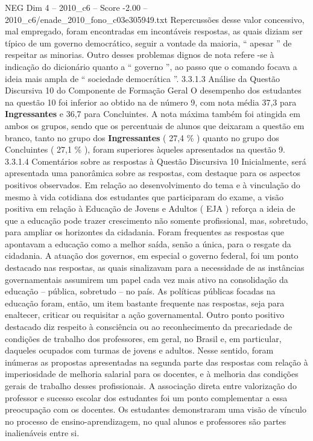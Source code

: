 \begin{textsample}{NEG Dim 4 – 2010\_c6 – Score -2.00 – 2010\_c6/enade\_2010\_fono\_c03e305949.txt}
Repercussões desse valor concessivo, mal empregado, foram encontradas em incontáveis respostas, as quais diziam ser típico de um governo democrático, seguir a vontade da maioria, “ apesar ” de respeitar as minorias.
Outro desses problemas dignos de nota refere -se à indicação do dicionário quanto a “ governo ”, ao passo que o comando focava a ideia mais ampla de “ sociedade democrática ”. 3.3.1.3 Análise da Questão Discursiva 10 do Componente de Formação Geral O desempenho dos estudantes na questão 10 foi inferior ao obtido na de número 9, com nota média 37,3 para \textbf{Ingressantes} e 36,7 para Concluintes.
A nota máxima também foi atingida em ambos os grupos, sendo que os percentuais de alunos que deixaram a questão em branco, tanto no grupo dos \textbf{Ingressantes} ( 27,4 \% ) quanto no grupo dos Concluintes ( 27,1 \% ), foram superiores àqueles apresentados na questão 9. 3.3.1.4 Comentários sobre as respostas à Questão Discursiva 10 Inicialmente, será apresentada uma panorâmica sobre as respostas, com destaque para os aspectos positivos observados.
Em relação ao desenvolvimento do tema e à vinculação do mesmo à vida cotidiana dos estudantes que participaram do exame, a visão positiva em relação à Educação de Jovens e Adultos ( EJA ) reforça a ideia de que a educação pode trazer crescimento não somente profissional, mas, sobretudo, para ampliar os horizontes da cidadania.
Foram frequentes as respostas que apontavam a educação como a melhor saída, senão a única, para o resgate da cidadania.
A atuação dos governos, em especial o governo federal, foi um ponto destacado nas respostas, as quais sinalizavam para a necessidade de as instâncias governamentais assumirem um papel cada vez mais ativo na consolidação da educação – pública, sobretudo – no país.
As políticas públicas focadas na educação foram, então, um item bastante frequente nas respostas, seja para enaltecer, criticar ou requisitar a ação governamental.
Outro ponto positivo destacado diz respeito à consciência ou ao reconhecimento da precariedade de condições de trabalho dos professores, em geral, no Brasil e, em particular, daqueles ocupados com turmas de jovens e adultos.
Nesse sentido, foram inúmeras as propostas apresentadas na segunda parte das respostas com relação à imperiosidade de melhoria salarial para os docentes, e à melhoria das condições gerais de trabalho desses profissionais.
A associação direta entre valorização do professor e sucesso escolar dos estudantes foi um ponto complementar a essa preocupação com os docentes.
Os estudantes demonstraram uma visão de vínculo no processo de ensino-aprendizagem, no qual alunos e professores são partes inalienáveis entre si.

\end{textsample}
